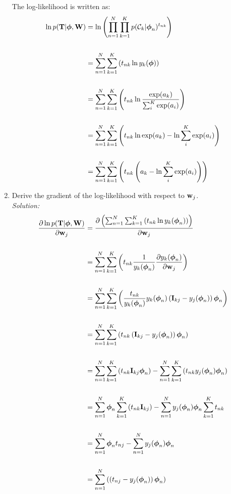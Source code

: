 \documentclass[12pt,a4paper]{article}
\newcommand{\lp}{\left(}
\newcommand{\rp}{\right)}
\newcommand{\eye}{{\bf I}}
\newcommand{\tscalar}{t}
\newcommand{\Tmat}{{\bf \MakeUppercase\tscalar}}
\newcommand{\wscalar}{w}
\newcommand{\wvec}{{\bf \wscalar}}
\newcommand{\Wmat}{{\bf \MakeUppercase\wscalar}}
\newcommand{\phivec}{\boldsymbol{\phi}}
\newcommand{\class}{\mathcal{C}}
\begin{document}
\begin{enumerate}
		The log-likelihood is written as:
		\begin{align*}
			\ln p(\Tmat | \phivec, \Wmat) &= \ln \lp \prod_{n=1}^N \prod_{k=1}^K p(\class_k | \phivec_n)^{t_{nk}} \rp \\\\
			&= \sum_{n=1}^N \sum_{k=1}^K \lp t_{nk} \ln y_k(\phivec) \rp \\\\
			&= \sum_{n=1}^N \sum_{k=1}^K \lp t_{nk} \ln \frac{\exp(a_k)}{\sum_i^K \exp(a_i)} \rp \\\\
			&= \sum_{n=1}^N \sum_{k=1}^K \lp t_{nk} \ln \exp(a_k) - \ln \sum_i^K \exp(a_i) \rp \\\\
			&= \sum_{n=1}^N \sum_{k=1}^K \lp t_{nk} \lp a_k - \ln \sum_i^K \exp(a_i) \rp \rp
		\end{align*}
		
		\item Derive the gradient of the log-likelihood with respect to $\wvec_{j}$. \\
		\emph{Solution:} \\
		
		\begin{align*}
			\frac{\partial \ln p(\Tmat | \phivec, \Wmat)}{\partial \wvec_j} &= \frac{\partial \lp \sum_{n=1}^N \sum_{k=1}^K \lp t_{nk} \ln y_k(\phivec_n) \rp \rp}{\partial \wvec_j} \\\\
			&= \sum_{n=1}^N \sum_{k=1}^K \lp t_{nk} \frac{1}{y_k(\phivec_n)} \frac{\partial y_k(\phivec_n)}{\partial \wvec_j} \rp \\\\
			&= \sum_{n=1}^N \sum_{k=1}^K \lp \frac{t_{nk}}{y_k(\phivec_n)} y_k(\phivec_n) \lp \eye_{kj} - y_j(\phivec_n) \rp \phivec_n \rp \\\\
			&= \sum_{n=1}^N \sum_{k=1}^K \lp t_{nk} \lp \eye_{kj} - y_j(\phivec_n) \rp \phivec_n \rp \\\\
			&= \sum_{n=1}^N \sum_{k=1}^K \lp t_{nk} \eye_{kj} \phivec_n \rp - \sum_{n=1}^N \sum_{k=1}^K \lp t_{nk} y_j(\phivec_n) \phivec_n \rp \\\\
			&= \sum_{n=1}^N \phivec_n \sum_{k=1}^K \lp t_{nk} \eye_{kj} \rp - \sum_{n=1}^N y_j(\phivec_n) \phivec_n \sum_{k=1}^K t_{nk} \\\\
			&= \sum_{n=1}^N \phivec_n  t_{nj} - \sum_{n=1}^N y_j(\phivec_n) \phivec_n \\\\
			&= \sum_{n=1}^N \lp \lp  t_{nj} -  y_j(\phivec_n) \rp \phivec_n \rp
		\end{align*}
		

\end{enumerate}
\end{document}
